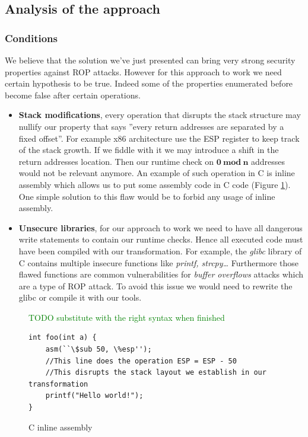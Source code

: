 \documentclass[11pt]{sdm}
\begin{document}
\subsection{Analysis of the approach}
\label{sub:Analysis of the approach}


\subsubsection{Conditions}
\label{ssub:Conditions}

We believe that the solution we've just presented can bring very strong security properties against ROP attacks. However for this approach to work we need certain hypothesis to be true. Indeed some of the properties enumerated before become false after certain operations.

\begin{itemize}
	\item \textbf{Stack modifications}, every operation that disrupts the stack structure may nullify our property that says ''every return addresses are separated by a fixed offset''. For example x86 architecture use the ESP register to keep track of the stack growth. If we fiddle with it we may introduce a shift in the return addresses location. Then our runtime check on $\mathbf{0~mod~n}$ addresses would not be relevant anymore.
		An example of such operation in C is inline assembly which allows us to put some assembly code in C code (Figure \ref{inline_assembly}). One simple solution to this flaw would be to forbid any usage of inline assembly.

	\item \textbf{Unsecure libraries}, for our approach to work we need to have all dangerous write statements to contain our runtime checks. Hence all executed code must have been compiled with our transformation. For example, the \textit{glibc} library of C contains multiple insecure functions like \textit{printf, strcpy\dots} Furthermore those flawed functions are common vulnerabilities for \textit{buffer overflows} attacks which are a type of ROP attack. To avoid this issue we would need to rewrite the glibc or compile it with our tools.
\end{itemize}

\begin{figure}
\textcolor{green}{TODO substitute with the right syntax when finished}
\begin{lstlisting}
int foo(int a) {
	asm(``\$sub 50, \%esp'');
	//This line does the operation ESP = ESP - 50
	//This disrupts the stack layout we establish in our transformation
	printf("Hello world!");
}
\end{lstlisting}
\centering
\caption{C inline assembly}
\label{inline_assembly}
\end{figure}
\end{document}
